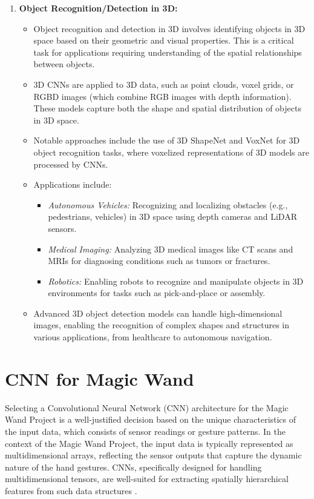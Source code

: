 \begin{enumerate}
	\item \textbf{Object Recognition/Detection in 3D:}
	\begin{itemize}
		\item Object recognition and detection in 3D involves identifying objects in 3D space based on their geometric and visual properties. This is a critical task for applications requiring understanding of the spatial relationships between objects.
		\item 3D CNNs are applied to 3D data, such as point clouds, voxel grids, or RGBD images (which combine RGB images with depth information). These models capture both the shape and spatial distribution of objects in 3D space.
		\item Notable approaches include the use of 3D ShapeNet and VoxNet for 3D object recognition tasks, where voxelized representations of 3D models are processed by CNNs.
		\item Applications include:
		\begin{itemize}
			\item \textit{Autonomous Vehicles:} Recognizing and localizing obstacles (e.g., pedestrians, vehicles) in 3D space using depth cameras and LiDAR sensors.
			\item \textit{Medical Imaging:} Analyzing 3D medical images like CT scans and MRIs for diagnosing conditions such as tumors or fractures.
			\item \textit{Robotics:} Enabling robots to recognize and manipulate objects in 3D environments for tasks such as pick-and-place or assembly.
		\end{itemize}
		\item Advanced 3D object detection models can handle high-dimensional images, enabling the recognition of complex shapes and structures in various applications, from healthcare to autonomous navigation.
	\end{itemize}
\end{enumerate}


\section{CNN for Magic Wand}

Selecting a Convolutional Neural Network (CNN) architecture for the Magic Wand Project is a well-justified decision based on the unique characteristics of the input data, which consists of sensor readings or gesture patterns. In the context of the Magic Wand Project, the input data is typically represented as multidimensional arrays, reflecting the sensor outputs that capture the dynamic nature of the hand gestures. CNNs, specifically designed for handling multidimensional tensors, are well-suited for extracting spatially hierarchical features from such data structures \cite{Warden:2020}.

